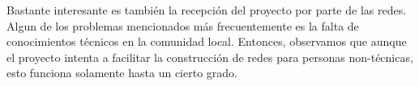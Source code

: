 Bastante interesante es también la recepción del proyecto por parte de las redes.
Algun de los problemas mencionados más frecuentemente es la falta de conocimientos técnicos en la comunidad local.
Entonces, observamos que aunque el proyecto intenta a facilitar la construcción de redes para personas non-técnicas, esto funciona solamente hasta un cierto grado.
\begin{comment}
  Recepción desde las Redes


* somos grupo de vecinos/amigos, que ha surgido desde el despliegue de la red, después de la semana de hackathon de construcción de la red
* nos faltan conocimientos técnicos, somos dependientes de otras redes, si un nodo se quema o la red se cae

* proyecto grande: diferentes grados de involucración
* mucho trabajo
* cómo atraer miembros nuevos?: reuniones con gente ya involucrada, que expliquen que es lo que les gusta en la red, como es su experiencia, "como cambió su vida por la parte de la red"

* 10 familias conectadas
* 1 persona responsable, empezó sola, el único nodo en el barrio; se reunió con gente de Altermundi después, intercambiando experiencia, etc.
* desde 2012-2013, después de José de la Quintana
* comparten datos, tráfico, etc.. --> para el responsable el aspecto social es clave: estar conectado con más personas, que comparten
* red comunitaria != internet gratis, sino se hace entre todosa -> importante que lxs participantes lo entiendan

* desde fines de 2013-2014
* 2016: 15 familias conectadas?
* tenían la necesidad, los proveedores no querían prestarle servicio y conocieron a QuintanaLibre
* ir de casa a casa, algo comunitario, sin un fin económico que estaba en vista
* la mayor dificultad entre vecinos: entender que es una red libre, sacarte un poco de la lógica del mercado, algo que se hace en la comunidad
* desafío: unir La Serranita con Córdoba, para tener conección; el tereno es duro, habían de subir mucho más alto;

* 25 nodos operativos: 18 familias y resto cabañeros?
* comenzó sep? 2014
* Nono: localidad túristica; por lo tanto la Camara de Comercio fue un de los impulsores del proyecto, cuando se enteró de ello
* conectividad importante para el desarollo personal pero también para el desarollo laboral del pueblo
* proyecto previo: Nono digital (tener wifi libre en Nono), se juntó con Altermundi -> NonoLibre;
* tenían 40 nodos, pero solamente 25 operativos, ya que el terreno es difícil
* desafío más grande: montar una antena en la Pampa de Acharla?
* experiencia muy linda, gratificante: trabajar en comunidad


\end{comment}
